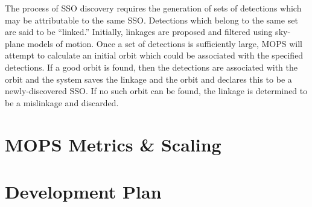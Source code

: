 \documentclass[12pt,preprint]{aastex}
\begin{document}
The process of SSO discovery requires the generation of sets of
detections which may be attributable to the same SSO.  Detections
which belong to the same set are said to be ``linked.'' Initially,
linkages are proposed and filtered using sky-plane models of motion.
Once a set of detections is sufficiently large, MOPS will attempt to
calculate an initial orbit which could be associated with the
specified detections.  If a good orbit is found, then the detections
are associated with the orbit and the system saves the linkage and the
orbit and declares this to be a newly-discovered SSO.  If no such
orbit can be found, the linkage is determined to be a mislinkage and
discarded.  




\section{MOPS Metrics \& Scaling}


\section{Development Plan}





\end{document}
